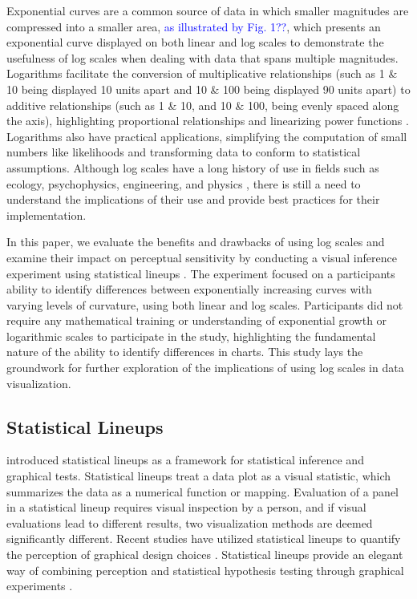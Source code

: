 \documentclass[12pt]{article}
\begin{document}
Exponential curves are a common source of data in which smaller
magnitudes are compressed into a smaller area,
{\textcolor{blue}{as illustrated by Fig. 1??}}, which presents an
exponential curve displayed on both linear and log scales to demonstrate
the usefulness of log scales when dealing with data that spans multiple
magnitudes. Logarithms facilitate the conversion of multiplicative
relationships (such as 1 \& 10 being displayed 10 units apart and 10 \&
100 being displayed 90 units apart) to additive relationships (such as 1
\& 10, and 10 \& 100, being evenly spaced along the axis), highlighting
proportional relationships and linearizing power functions
\citep{menge_logarithmic_2018}. Logarithms also have practical
applications, simplifying the computation of small numbers like
likelihoods and transforming data to conform to statistical assumptions.
Although log scales have a long history of use in fields such as
ecology, psychophysics, engineering, and physics
\citep{heckler_student_2013, waddell2005comparisons}, there is still a
need to understand the implications of their use and provide best
practices for their implementation.

In this paper, we evaluate the benefits and drawbacks of using log
scales and examine their impact on perceptual sensitivity by conducting
a visual inference experiment using statistical lineups
\citep{buja_statistical_2009}. The experiment focused on a participants
ability to identify differences between exponentially increasing curves
with varying levels of curvature, using both linear and log scales.
Participants did not require any mathematical training or understanding
of exponential growth or logarithmic scales to participate in the study,
highlighting the fundamental nature of the ability to identify
differences in charts. This study lays the groundwork for further
exploration of the implications of using log scales in data
visualization.

\hypertarget{statistical-lineups}{%
\subsection{Statistical Lineups}\label{statistical-lineups}}

\citet{buja_statistical_2009} introduced statistical lineups as a
framework for statistical inference and graphical tests. Statistical
lineups treat a data plot as a visual statistic, which summarizes the
data as a numerical function or mapping. Evaluation of a panel in a
statistical lineup requires visual inspection by a person, and if visual
evaluations lead to different results, two visualization methods are
deemed significantly different. Recent studies have utilized statistical
lineups to quantify the perception of graphical design choices
\citep{hofmann_graphical_2012, loy_model_2017, loy_variations_2016, vanderplas_clusters_2017}.
Statistical lineups provide an elegant way of combining perception and
statistical hypothesis testing through graphical experiments
\citep{majumder_validation_2013, vanderplas_testing_2020, wickham2010graphical}.
\end{document}

